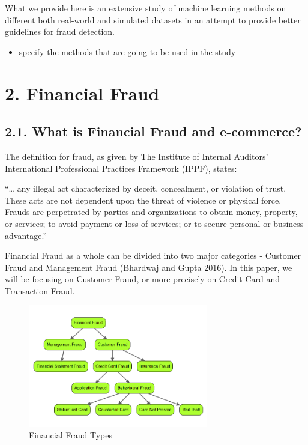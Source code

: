 \documentclass[12pt,]{article}
\providecommand{\tightlist}{%
  \setlength{\itemsep}{0pt}\setlength{\parskip}{0pt}}
\begin{document}
What we provide here is an extensive study of machine learning methods
on different both real-world and simulated datasets in an attempt to
provide better guidelines for fraud detection.

\begin{itemize}
\tightlist
\item
  specify the methods that are going to be used in the study
\end{itemize}

\hypertarget{financial-fraud}{%
\section{2. Financial Fraud}\label{financial-fraud}}

\hypertarget{what-is-financial-fraud-and-e-commerce}{%
\subsection{2.1. What is Financial Fraud and
e-commerce?}\label{what-is-financial-fraud-and-e-commerce}}

The definition for fraud, as given by The Institute of Internal
Auditors' International Professional Practices Framework (IPPF), states:

``\ldots{} any illegal act characterized by deceit, concealment, or
violation of trust. These acts are not dependent upon the threat of
violence or physical force. Frauds are perpetrated by parties and
organizations to obtain money, property, or services; to avoid payment
or loss of services; or to secure personal or business advantage.''

Financial Fraud as a whole can be divided into two major categories -
Customer Fraud and Management Fraud (Bhardwaj and Gupta 2016). In this
paper, we will be focusing on Customer Fraud, or more precisely on
Credit Card and Transaction Fraud.

\begin{figure}
\centering
\includegraphics[width=0.7\textwidth,height=\textheight]{figures/fraud_hierarchy.png}
\caption{Financial Fraud Types}
\end{figure}
\end{document}
